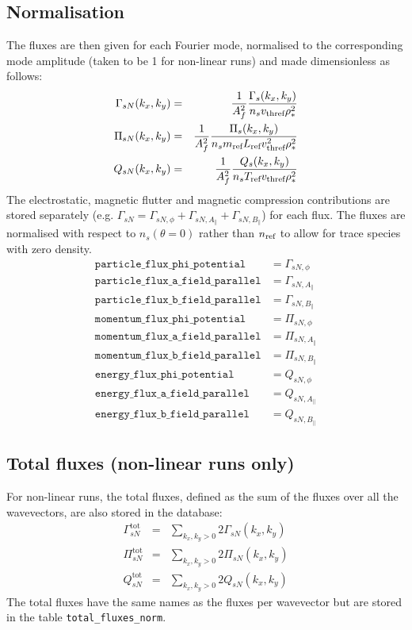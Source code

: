 \documentclass[a4paper]{report}
\begin{document}
\subsection{Normalisation}
The fluxes are then given for each Fourier mode, normalised to the corresponding mode amplitude (taken to be 1 for non-linear runs) and made dimensionless as follows:
\begin{eqnarray}
 \Gamma_{sN}(k_x,k_y) &=& \frac{1}{A_f^2}\frac{\Gamma_s(k_x,k_y)}{n_s v_\textrm{thref} \rho_*^2}\\
 \Pi_{sN}(k_x,k_y) &=& \frac{1}{A_f^2}\frac{\Pi_s(k_x,k_y)}{n_s m_{\textrm{ref}} L_{\textrm{ref}} v_\textrm{thref}^2 \rho_*^2}\\
 Q_{sN}(k_x,k_y) &=& \frac{1}{A_f^2}\frac{Q_s(k_x,k_y)}{n_s T_{\textrm{ref}} v_\textrm{thref} \rho_*^2}
\end{eqnarray}
The electrostatic, magnetic flutter and magnetic compression contributions are stored separately (e.g. $\Gamma_{sN}=\Gamma_{sN,\phi}+\Gamma_{sN,A_\parallel}+\Gamma_{sN,B_\parallel}$) for each flux. The fluxes are normalised with respect to $n_s(\theta=0)$ rather than $n_{\textrm{ref}}$ to allow for trace species with zero density.
\begin{align*}
 \texttt{particle\_flux\_phi\_potential} &= \Gamma_{sN,\phi} \\
 \texttt{particle\_flux\_a\_field\_parallel} &= \Gamma_{sN,A_\parallel} \\
 \texttt{particle\_flux\_b\_field\_parallel} &= \Gamma_{sN,B_\parallel} \\
 \texttt{momentum\_flux\_phi\_potential} &= \Pi_{sN,\phi} \\
 \texttt{momentum\_flux\_a\_field\_parallel} &= \Pi_{sN,A_\parallel} \\
 \texttt{momentum\_flux\_b\_field\_parallel} &= \Pi_{sN,B_\parallel} \\
 \texttt{energy\_flux\_phi\_potential} &= Q_{sN,\phi} \\
 \texttt{energy\_flux\_a\_field\_parallel} &= Q_{sN,A_\parallel} \\
 \texttt{energy\_flux\_b\_field\_parallel} &= Q_{sN,B_\parallel}
\end{align*}

\subsection{Total fluxes (non-linear runs only)}
For non-linear runs, the total fluxes,  defined as the sum of the fluxes over all the wavevectors, are also stored in the database:
\begin{eqnarray}
\Gamma_{sN}^\textrm{tot} &=& \sum_{k_x, k_y>0} 2\Gamma_{sN}(k_x,k_y)\\
\Pi_{sN}^\textrm{tot} &=&  \sum_{k_x, k_y>0} 2\Pi_{sN}(k_x,k_y)\\
Q_{sN}^\textrm{tot} &=&  \sum_{k_x, k_y>0} 2Q_{sN}(k_x,k_y) 
\end{eqnarray}
The total fluxes have the same names as the fluxes per wavevector but are stored in the table \texttt{total\_fluxes\_norm}.
\end{document}
